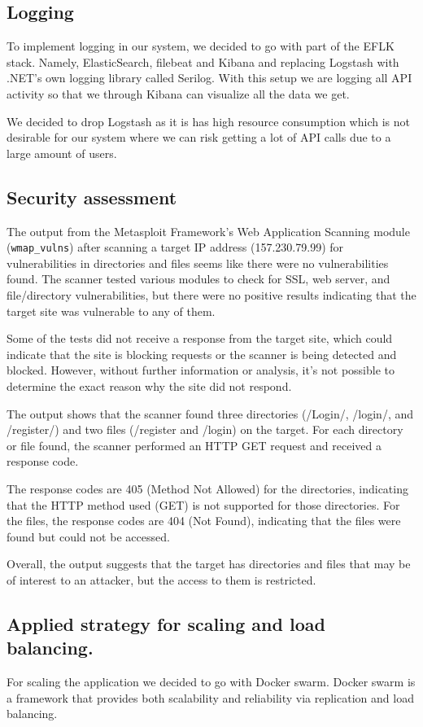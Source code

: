 \documentclass{article}
\begin{document}
\subsection{Logging}
To implement logging in our system, we decided to go with part of the EFLK stack. Namely, ElasticSearch, filebeat and Kibana and replacing Logstash with .NET’s own logging library called Serilog. With this setup we are logging all API activity so that we through Kibana can visualize all the data we get.

We decided to drop Logstash as it is has high resource consumption which is not desirable for our system where we can risk getting a lot of API calls due to a large amount of users.
\subsection{Security assessment}
The output from the Metasploit Framework's Web Application Scanning module (\verb|wmap_vulns|) after scanning a target IP address (157.230.79.99) for vulnerabilities in directories and files seems like there were no vulnerabilities found. The scanner tested various modules to check for SSL, web server, and file/directory vulnerabilities, but there were no positive results indicating that the target site was vulnerable to any of them. 

Some of the tests did not receive a response from the target site, which could indicate that the site is blocking requests or the scanner is being detected and blocked. However, without further information or analysis, it's not possible to determine the exact reason why the site did not respond.

The output shows that the scanner found three directories (/Login/, /login/, and /register/) and two files (/register and /login) on the target. For each directory or file found, the scanner performed an HTTP GET request and received a response code.


The response codes are 405 (Method Not Allowed) for the directories, indicating that the HTTP method used (GET) is not supported for those directories. For the files, the response codes are 404 (Not Found), indicating that the files were found but could not be accessed.

Overall, the output suggests that the target has directories and files that may be of interest to an attacker, but the access to them is restricted.

\subsection{Applied strategy for scaling and load balancing.}
For scaling the application we decided to go with Docker swarm. Docker swarm is a framework that provides both scalability and reliability via replication and load balancing.
\end{document}
